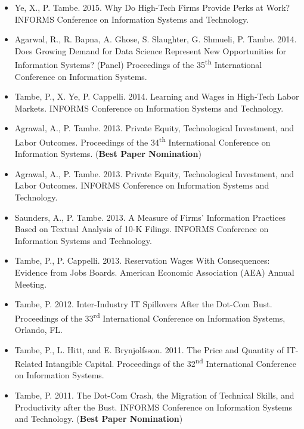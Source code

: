 \documentclass[10pt,letterpaper]{article}
\begin{document}
\begin{itemize}
\item Ye, X., P. Tambe. 2015. Why Do High-Tech Firms Provide Perks at Work? INFORMS Conference on Information Systems and Technology.

\item Agarwal, R., R. Bapna, A. Ghose, S. Slaughter, G. Shmueli, P. Tambe. 2014. Does Growing Demand for Data Science Represent New Opportunities for Information Systems? (Panel) Proceedings of the 35\textsuperscript{th} International Conference on Information Systems.

\item Tambe, P., X. Ye, P. Cappelli. 2014. Learning and Wages in High-Tech Labor Markets.  INFORMS Conference on Information Systems and Technology.

\item Agrawal, A., P. Tambe. 2013. Private Equity, Technological Investment, and Labor Outcomes. Proceedings of the 34\textsuperscript{th} International Conference on Information Systems. (\textbf{Best Paper Nomination})

\item Agrawal, A., P. Tambe. 2013. Private Equity, Technological Investment, and Labor Outcomes.  INFORMS Conference on Information Systems and Technology.

\item Saunders, A., P. Tambe. 2013. A Measure of Firms' Information Practices Based on Textual Analysis of 10-K Filings.  INFORMS Conference on Information Systems and Technology.

\item Tambe, P., P. Cappelli. 2013. Reservation Wages With Consequences: Evidence from Jobs Boards. American Economic Association (AEA) Annual Meeting.

\item Tambe, P. 2012. Inter-Industry IT Spillovers After the Dot-Com Bust. Proceedings of the 33\textsuperscript{rd} International Conference on Information Systems, Orlando, FL. 

\item Tambe, P., L. Hitt, and E. Brynjolfsson. 2011. The Price and Quantity of IT-Related Intangible Capital.  Proceedings of the 32\textsuperscript{nd} International Conference on Information Systems.

\item Tambe, P. 2011. The Dot-Com Crash, the Migration of Technical Skills, and Productivity after the Bust.  INFORMS Conference on Information Systems and Technology. (\textbf{Best Paper Nomination})


\end{itemize}
\end{document}
